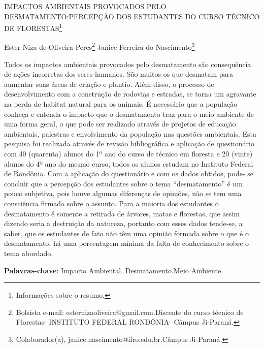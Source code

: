 \documentclass[article,12pt,onesidea,4paper,english,brazil]{abntex2}
\begin{document}
	
	
	\frenchspacing 
	
	\begin{center}
		\LARGE IMPACTOS AMBIENTAIS PROVOCADOS PELO DESMATAMENTO:PERCEPÇÃO DOS ESTUDANTES DO CURSO TÉCNICO DE FLORESTAS\footnote{Informações sobre o resumo.}
		
		\normalsize
	Ester Niza de Oliveira Peres\footnote{Bolsista e-mail: esternizaoliveira@gmail.com.Discente do curso técnico de Florestas-
		INSTITUTO FEDERAL RONDÔNIA- Câmpus Ji-Paraná.} 
		Janice Ferreira do Nascimento\footnote{Colaborador(a), janice.nascimento@ifro.edu.br.Câmpus Ji-Paraná.} 
	\end{center}
	
	\noindent Todos os impactos ambientais provocados pelo desmatamento são consequência de
	ações incorretas dos seres humanos. São muitos os que desmatam para aumentar
	suas áreas de criação e plantio. Além disso, o processo de desenvolvimento com a
	construção de rodovias e estradas, se torna um agravante na perda de habitat
	natural para os animais. É necessário que a população conheça e entenda o
	impacto que o desmatamento traz para o meio ambiente de uma forma geral, o que
	pode ser realizado através de projetos de educação ambientais, palestras e
	envolvimento da população nas questões ambientais. Esta pesquisa foi realizada
	através de revisão bibliográfica e aplicação de questionário com 40 (quarenta)
	alunos do 1º ano do curso de técnico em floresta e 20 (vinte) alunos do 4º ano do
	mesmo curso, todos os alunos estudam no Instituto Federal de Rondônia. Com a
	aplicação do questionário e com os dados obtidos, pode- se concluir que a
	percepção dos estudantes sobre o tema “desmatamento” é um pouco subjetiva, pois
	houve algumas diferenças de opiniões, não se tem uma consciência firmada sobre o
	assunto. Para a maioria dos estudantes o desmatamento é somente a retirada de
	árvores, matas e florestas, que assim dizendo seria a destruição da natureza,
	portanto com esses dados tende-se, a saber, que os estudantes de fato não têm
	uma opinião formada sobre o que é o desmatamento, há uma porcentagem mínima
	da falta de conhecimento sobre o tema abordado.
	
	\vspace{\onelineskip}
	
	\noindent
	\textbf{Palavras-chave}: Impacto Ambiental. Desmatamento.Meio Ambiente.
	
\end{document}
